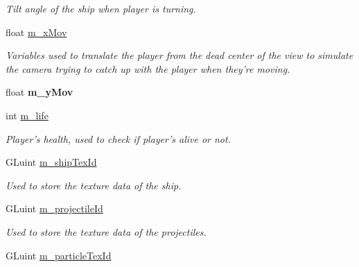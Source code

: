 \begin{DoxyCompactItemize}
\begin{DoxyCompactList}\small\item\em Tilt angle of the ship when player is turning. \item\end{DoxyCompactList}\item 
\hypertarget{classPlayer_adf2ebd1f7764a2c58e87c3de5f9b8c1b}{
float \hyperlink{classPlayer_adf2ebd1f7764a2c58e87c3de5f9b8c1b}{m\_\-xMov}}
\label{classPlayer_adf2ebd1f7764a2c58e87c3de5f9b8c1b}

\begin{DoxyCompactList}\small\item\em Variables used to translate the player from the dead center of the view to simulate the camera trying to catch up with the player when they're moving. \item\end{DoxyCompactList}\item 
\hypertarget{classPlayer_a012e67aa649ae598ac50c9200f4173f6}{
float {\bfseries m\_\-yMov}}
\label{classPlayer_a012e67aa649ae598ac50c9200f4173f6}

\item 
\hypertarget{classPlayer_a73d34798fcff9a49de129b8f4be47428}{
int \hyperlink{classPlayer_a73d34798fcff9a49de129b8f4be47428}{m\_\-life}}
\label{classPlayer_a73d34798fcff9a49de129b8f4be47428}

\begin{DoxyCompactList}\small\item\em Player's health, used to check if player's alive or not. \item\end{DoxyCompactList}\item 
\hypertarget{classPlayer_aa7a30e3db7e74ff6c90223f20e38742f}{
GLuint \hyperlink{classPlayer_aa7a30e3db7e74ff6c90223f20e38742f}{m\_\-shipTexId}}
\label{classPlayer_aa7a30e3db7e74ff6c90223f20e38742f}

\begin{DoxyCompactList}\small\item\em Used to store the texture data of the ship. \item\end{DoxyCompactList}\item 
\hypertarget{classPlayer_a14ba1b8a2dd9a43f9c32893ba4150e94}{
GLuint \hyperlink{classPlayer_a14ba1b8a2dd9a43f9c32893ba4150e94}{m\_\-projectileId}}
\label{classPlayer_a14ba1b8a2dd9a43f9c32893ba4150e94}

\begin{DoxyCompactList}\small\item\em Used to store the texture data of the projectiles. \item\end{DoxyCompactList}\item 
\hypertarget{classPlayer_a63405cbf43f777ae02ffc31cd6a06de6}{
GLuint \hyperlink{classPlayer_a63405cbf43f777ae02ffc31cd6a06de6}{m\_\-particleTexId}}
\label{classPlayer_a63405cbf43f777ae02ffc31cd6a06de6}


\end{DoxyCompactItemize}
